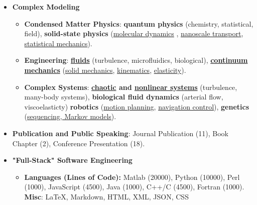 \documentclass{article}
\begin{document}
\begin{itemize}[leftmargin=*]


  \item \textbf{Complex Modeling}
  \begin{itemize}
    \item \textbf{Condensed Matter Physics}: \textbf{quantum physics} (chemistry, statistical, field), \textbf{solid-state physics} (\href{https://en.wikipedia.org/wiki/Molecular_dynamics}{molecular dynamics} , \href{http://ntpl.me.cmu.edu/}{nanoscale transport}, \href{https://en.wikipedia.org/wiki/Statistical_mechanics}{statistical mechanics}).
    \item \textbf{Engineering}: \textbf{\href{https://en.wikipedia.org/wiki/Fluid}{fluids}} (turbulence,  microfluidics, biological), \textbf{\href{https://en.wikipedia.org/wiki/Continuum_mechanics}{continuum mechanics}} (\href{https://en.wikipedia.org/wiki/Solid_mechanics}{solid mechanics}, \href{https://en.wikipedia.org/wiki/Kinematics}{kinematics}, \href{https://en.wikipedia.org/wiki/Elasticity_(physics)}{elasticity}).
    \item \textbf{Complex Systems}: \textbf{\href{https://en.wikipedia.org/wiki/Chaos_theory}{chaotic} and \href{https://en.wikipedia.org/wiki/Nonlinear_system}{nonlinear systems}} (turbulence, many-body systems), \textbf{biological fluid dynamics} (arterial flow, viscoelasticty) \textbf{robotics} (\href{https://en.wikipedia.org/wiki/Motion_planning}{motion planning}, \href{https://en.wikipedia.org/wiki/Mobile_robot_navigation}{navigation control}), \textbf{genetics} (\href{https://en.wikipedia.org/wiki/Markov_chain}{sequencing, Markov models}).

  \end{itemize}

  \item \textbf{Publication and Public Speaking}: Journal Publication (11), Book Chapter (2), Conference Presentation (18).

  \item \textbf{"Full-Stack" Software Engineering}
  \begin{itemize}

    \item \textbf{Languages (Lines of Code): } Matlab (20000), Python (10000), Perl (1000), JavaScript (4500), Java (1000), C++/C (4500), Fortran (1000). \textbf{Misc}: \LaTeX, Markdown, HTML, XML, JSON, CSS 


\end{itemize}
\end{itemize}
\end{document}
